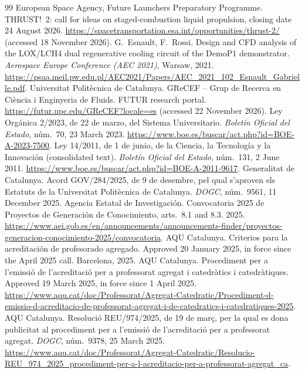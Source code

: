 \documentclass[11pt]{article}
\begin{document}
\begin{thebibliography}{99}
 European Space Agency, Future Launchers Preparatory Programme. THRUST!~2: call for ideas on staged-combustion liquid propulsion, closing date 24 August 2026. \url{https://spacetransportation.esa.int/opportunities/thrust-2/} (accessed 18 November 2026).
 G.\ Esnault, F.\ Rossi. Design and CFD analysis of the LOX/LCH4 dual regenerative cooling circuit of the DemoP1 demonstrator. \emph{Aerospace Europe Conference (AEC 2021)}, Warsaw, 2021. \url{https://psaa.meil.pw.edu.pl/AEC2021/Papers/AEC_2021_102_Esnault_Gabrielle.pdf}.
 Universitat Polit\`ecnica de Catalunya. GReCEF -- Grup de Recerca en Ci\`encia i Enginyeria de Fluids. FUTUR research portal. \url{https://futur.upc.edu/GReCEF?locale=es} (accessed 22 November 2026).
 Ley Org\'anica 2/2023, de 22 de marzo, del Sistema Universitario. \emph{Bolet\'in Oficial del Estado}, n\'um.~70, 23 March 2023. \url{https://www.boe.es/buscar/act.php?id=BOE-A-2023-7500}.
 Ley 14/2011, de 1 de junio, de la Ciencia, la Tecnolog\'ia y la Innovaci\'on (consolidated text). \emph{Bolet\'in Oficial del Estado}, n\'um.~131, 2 June 2011. \url{https://www.boe.es/buscar/act.php?id=BOE-A-2011-9617}.
 Generalitat de Catalunya. Acord GOV/284/2025, de 9 de desembre, pel qual s'aproven els Estatuts de la Universitat Polit\`ecnica de Catalunya. \emph{DOGC}, n\'um.~9561, 11 December 2025.
 Agencia Estatal de Investigaci\'on. Convocatoria 2025 de Proyectos de Generaci\'on de Conocimiento, arts.~8.1 and 8.3. 2025. \url{https://www.aei.gob.es/en/announcements/announcements-finder/proyectos-generacion-conocimiento-2025/convocatoria}.
 AQU Catalunya. Criterios para la acreditaci\'on de profesorado agregado. Approved 20 January 2025, in force since the April 2025 call. Barcelona, 2025.
 AQU Catalunya. Procediment per a l'emissi\'o de l'acreditaci\'o per a professorat agregat i catedr\`atics i catedr\`atiques. Approved 19 March 2025, in force since 1 April 2025. {\def\UrlBreaks{\do\/\do\-}\url{https://www.aqu.cat/doc/Professorat/Agregat-Catedratic/Procediment-d-emissio-d-acreditacio-de-professorat-agregat-i-de-catedratics-i-catedratiques-2025}}.
 AQU Catalunya. Resoluci\'o REU/974/2025, de 19 de mar\c{c}, per la qual es dona publicitat al procediment per a l'emissi\'o de l'acreditaci\'o per a professorat agregat. \emph{DOGC}, n\'um.~9378, 25 March 2025. \url{https://www.aqu.cat/doc/Professorat/Agregat-Catedratic/Resolucio-REU_974_2025_procediment-per-a-l-acreditacio-per-a-professorat-agregat_ca}.

\end{thebibliography}
\end{document}
